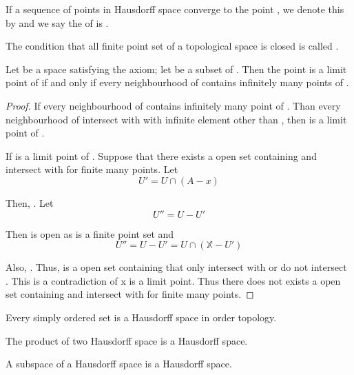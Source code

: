 \begin{definition}[limit]\label{def:Limit}
      If a sequence  of points in Hausdorff space converge to the point , we denote this by  and we say the  of  is .
\end{definition}

\begin{definition}[\mt{T_{1}} axiom]\label{def:T1Axiom}
      The condition that all finite point set of a topological space is closed is called .
\end{definition}

\begin{theorem}
      Let  be a space satisfying the  axiom; let  be a subset of . Then the point  is a limit point of  if and only if every neighbourhood of  contains infinitely many points of .
\end{theorem}

\begin{proof}
      If every neighbourhood of  contains infinitely many point of . Than every neighbourhood of  intersect with  with infinite element other than , then  is a limit point of .

      If  is a limit point of . Suppose that there exists a open set  containing  and intersect with  for finite many points.
      Let
      \begin{equation*}
            U' = U \cap ( A - x )
      \end{equation*}

      Then, .
      Let 
      \begin{equation*}
            U'' = U - U'
      \end{equation*}

      Then  is open as  is a finite point set and
      \begin{equation*}
            U'' = U - U' = U \cap (\mathbb{X} - U')
      \end{equation*}
      
      Also, .
      Thus,  is a open set containing  that only intersect  with  or do not intersect . This is a contradiction of x is a limit point. Thus there does not exists a open set  containing  and intersect with  for finite many points.
\end{proof}

\begin{theorem}\omitObviuos
      Every simply ordered set is a Hausdorff space in order topology.
\end{theorem}

\begin{theorem}\omitObviuos
      The product of two Hausdorff space is a Hausdorff space.
\end{theorem}

\begin{theorem}\omitObviuos
      A subspace of a Hausdorff space is a Hausdorff space.
\end{theorem}
